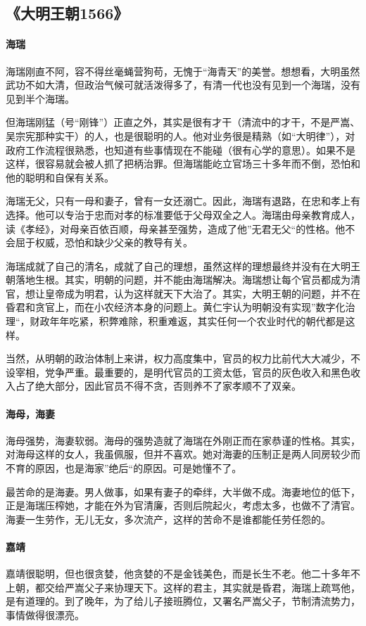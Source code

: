 \subsection{《大明王朝1566》}
\paragraph{海瑞}
海瑞刚直不阿，容不得丝毫蝇营狗苟，无愧于“海青天”的美誉。想想看，大明虽然武功不如大清，但政治气候可就活泼得多了，有清一代也没有见到一个海瑞，没有见到半个海瑞。

但海瑞刚猛（号“刚锋”）正直之外，其实是很有才干（清流中的才干，不是严嵩、吴宗宪那种实干）的人，也是很聪明的人。他对业务很是精熟（如“大明律”），对政府工作流程很熟悉，也知道有些事情现在不能碰（很有心学的意思）。如果不是这样，很容易就会被人抓了把柄治罪。但海瑞能屹立官场三十多年而不倒，恐怕和他的聪明和自保有关系。

海瑞无父，只有一母和妻子，曾有一女还溺亡。因此，海瑞有退路，在忠和孝上有选择。他可以专治于忠而对孝的标准要低于父母双全之人。海瑞由母亲教育成人，读《孝经》，对母亲百依百顺，母亲甚至强势，造成了他”无君无父“的性格。他不会屈于权威，恐怕和缺少父亲的教导有关。

海瑞成就了自己的清名，成就了自己的理想，虽然这样的理想最终并没有在大明王朝落地生根。其实，明朝的问题，并不能由海瑞解决。海瑞想让每个官员都成为清官，想让皇帝成为明君，认为这样就天下大治了。其实，大明王朝的问题，并不在昏君和贪官上，而在小农经济本身的问题上。黄仁宇认为明朝没有实现”数字化治理“，财政年年吃紧，积弊难除，积重难返，其实任何一个农业时代的朝代都是这样。

当然，从明朝的政治体制上来讲，权力高度集中，官员的权力比前代大大减少，不设宰相，党争严重。最重要的，是明代官员的工资太低，官员的灰色收入和黑色收入占了绝大部分，因此官员不得不贪，否则养不了家孝顺不了双亲。

\paragraph{海母，海妻}
海母强势，海妻软弱。海母的强势造就了海瑞在外刚正而在家恭谨的性格。其实，对海母这样的女人，我虽佩服，但并不喜欢。她对海妻的压制正是两人同房较少而不育的原因，也是海家”绝后“的原因。可是她懂不了。

最苦命的是海妻。男人做事，如果有妻子的牵绊，大半做不成。海妻地位的低下，正是海瑞压榨她，才能在外为官清廉，否则后院起火，考虑太多，也做不了清官。海妻一生劳作，无儿无女，多次流产，这样的苦命不是谁都能任劳任怨的。

\paragraph{嘉靖}
嘉靖很聪明，但也很贪婪，他贪婪的不是金钱美色，而是长生不老。他二十多年不上朝，都交给严嵩父子来协理天下。这样的君主，其实就是昏君，海瑞上疏骂他，是有道理的。到了晚年，为了给儿子接班腾位，又署名严嵩父子，节制清流势力，事情做得很漂亮。

